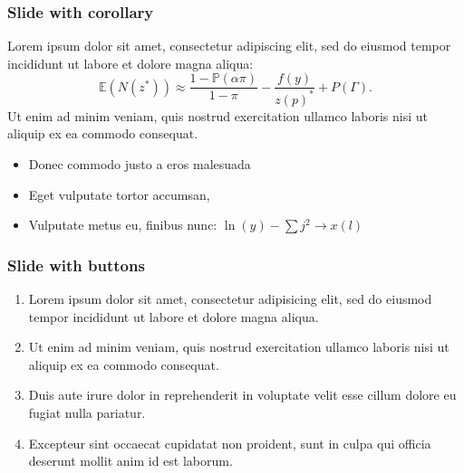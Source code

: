 \expandafter\documentclass\expandafter[\presentationclassoptions]{beamer}
\begin{document}
\begin{frame}
  \frametitle{Slide with corollary}
  \begin{singlespace}
    \begin{corollary}
      Lorem ipsum dolor sit amet, consectetur adipiscing elit, sed do eiusmod tempor incididunt ut labore et dolore magna aliqua:
      \begin{equation*}
        \mathbb{E}(N(z^*)) \approx \frac{1-\mathbb{P}(\alpha\pi)}{1-\pi}- \frac{f(y)}{z(p)^*} + P(\Gamma).
      \end{equation*}
      Ut enim ad minim veniam, quis nostrud exercitation ullamco laboris nisi ut aliquip ex ea commodo consequat.
    \end{corollary}
    \begin{itemize}
      \item Donec commodo justo a eros malesuada
      \item Eget vulputate tortor accumsan,
      \item Vulputate metus eu, finibus nunc: $\ln(y) - \sum j^2 \to x(l)$
    \end{itemize}
  \end{singlespace}
\end{frame}

\begin{frame}
\end{frame}

\begin{frame}[label=firstSlide]
  \frametitle{Slide with buttons}
  \begin{enumerate}
    \item Lorem ipsum dolor sit amet, consectetur adipisicing elit, sed do eiusmod
      tempor incididunt ut labore et dolore magna aliqua.
    \item  Ut enim ad minim veniam, quis nostrud exercitation ullamco laboris nisi ut aliquip ex ea commodo consequat.
    \item Duis aute irure dolor in reprehenderit in voluptate velit esse
      cillum dolore eu fugiat nulla pariatur.
    \item Excepteur sint occaecat cupidatat non proident, sunt in culpa qui officia deserunt mollit anim id est laborum.
  \end{enumerate}
  \hyperlink{backupSlide}{}
  \hyperlink{anotherBackupSlide}{}
\end{frame}
\end{document}
